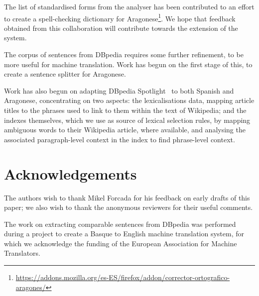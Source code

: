 \documentclass[10pt,a4paper,twocolumn]{article}
\begin{document}
  The list of standardised forms from the analyser has been contributed to an effort to create a spell-checking dictionary for Aragonese\footnote{\url{https://addons.mozilla.org/es-ES/firefox/addon/corrector-ortografico-aragones/}}. We hope that feedback obtained from this collaboration will contribute towards the extension of the system.

  The corpus of sentences from DBpedia requires some further refinement, to be more useful for machine translation. Work has begun on the first stage of this, to create a sentence splitter for Aragonese.

  Work has also begun on adapting DBpedia Spotlight~\cite{spotlight} to both Spanish and Aragonese, concentrating on two aspects: the lexicalisations data, mapping article titles to the phrases used to link to them within the text of Wikipedia; and the indexes themselves, which we use as source of lexical selection rules, by mapping ambiguous words to their Wikipedia article, where available, and analysing the associated paragraph-level context in the index to find phrase-level context. 

  \section{Acknowledgements}

  The authors wish to thank Mikel Forcada for his feedback on early drafts of this paper; we also wish to thank the anonymous reviewers for their useful comments.

  The work on extracting comparable sentences from DBpedia was performed during a project to create a Basque to English machine translation system, for which we acknowledge the funding of the European Association for Machine Translators.



  
\end{document}
